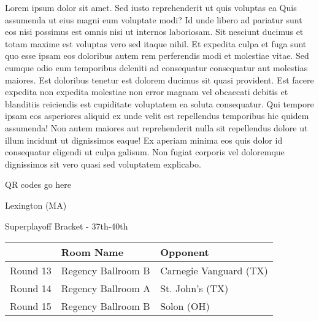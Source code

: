 \documentclass{article}%
\begin{document}
\vspace*{8pt}%
\linebreak%
\newline%
\newline%
Lorem ipsum dolor sit amet. Sed iusto reprehenderit ut quis voluptas ea Quis assumenda ut eius magni eum voluptate modi? Id unde libero ad pariatur sunt eos nisi possimus est omnis nisi ut internos laboriosam. Sit nesciunt ducimus et totam maxime est voluptas vero sed itaque nihil. Et expedita culpa et fuga sunt quo esse ipsam eos doloribus autem rem perferendis modi et molestiae vitae.\newline%
\newline%
Sed cumque odio eum temporibus deleniti ad consequatur consequatur aut molestias maiores. Est doloribus tenetur est dolorem ducimus sit quasi provident. Est facere expedita non expedita molestiae non error magnam vel obcaecati debitis et blanditiis reiciendis est cupiditate voluptatem ea soluta consequatur. Qui tempore ipsam eos asperiores aliquid ex unde velit est repellendus temporibus hic quidem assumenda!\newline%
\newline%
Non autem maiores aut reprehenderit nulla sit repellendus dolore ut illum incidunt ut dignissimos eaque! Ex aperiam minima eos quis dolor id consequatur eligendi ut culpa galisum. Non fugiat corporis vel doloremque dignissimos sit vero quasi sed voluptatem explicabo.\newline%
\newline%
%
\vspace*{30pt}%
\begin{center}%
\begin{Huge}%
QR codes go here%
\end{Huge}%
\end{center}%
\newpage%
\begin{center}%
\begin{Huge}%
Lexington (MA)%
\end{Huge}%
\vspace*{8pt}%
\linebreak%
\begin{Large}%
Superplayoff Bracket {-} 37th{-}40th%
\end{Large}%
\end{center}%
%
\begin{tabularx}{\textwidth}{|c|Y|Y|}%
\hline%
&Room Name&Opponent\\%
\hline%
Round 13&Regency Ballroom B&Carnegie Vanguard (TX)\\%
Round 14&Regency Ballroom A&St. John's (TX)\\%
Round 15&Regency Ballroom B&Solon (OH)\\%
\hline%
\end{tabularx}%
\end{document}

